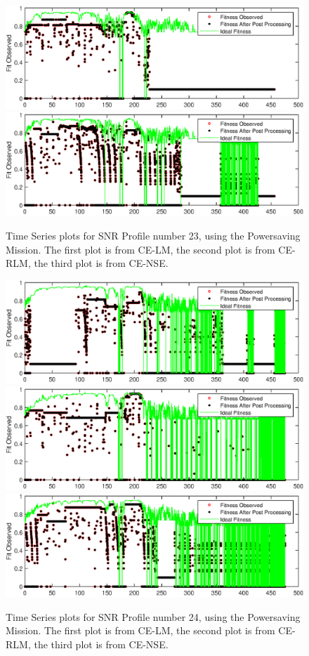 \begin{appendices}
\begin{figure}[ht!]
\includegraphics{figures/c_sim_timeSeries/Fitness_timeSeries_RLM_23.eps}
\includegraphics{figures/c_sim_timeSeries/Fitness_timeSeries_NSE_23.eps}
\caption{Time Series plots for SNR Profile number 23, using the Powersaving Mission. The first plot is from CE-LM, the second plot is from CE-RLM, the third plot is from CE-NSE.}
\end{figure}
\begin{figure}[ht!]
\includegraphics{figures/c_sim_timeSeries/Fitness_timeSeries_LM_24.eps}
\includegraphics{figures/c_sim_timeSeries/Fitness_timeSeries_RLM_24.eps}
\includegraphics{figures/c_sim_timeSeries/Fitness_timeSeries_NSE_24.eps}
\caption{Time Series plots for SNR Profile number 24, using the Powersaving Mission. The first plot is from CE-LM, the second plot is from CE-RLM, the third plot is from CE-NSE.}
\end{figure}
\clearpage


\end{appendices}
